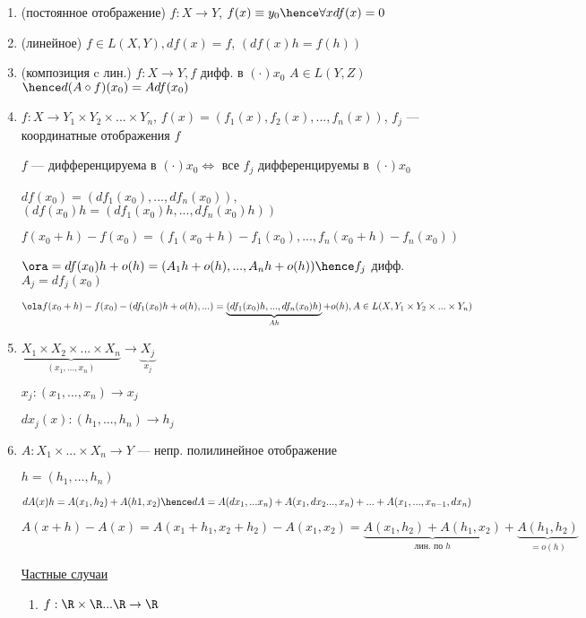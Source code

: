 \begin{examples}
\begin{enumerate}
    \item (постоянное отображение) $f: X \to Y$, $f(x) \equiv y_0 \hence \forall x df(x) = 0$
    \item (линейное) $f \in L(X, Y), df(x) = f$, $(df(x)h = f(h))$
    \item (композиция c лин.) $f : X \to Y, f$ дифф. в $(\cdot) x_0$ $A \in L(Y, Z)$ 
        $ \hence d(A \circ f)(x_0) = Adf(x_0)$
    \item $f : X \to Y_1 \times Y_2 \times ... \times Y_n$, $f(x) = (f_1(x), f_2(x), ..., f_n(x))$, $f_j$ --- координатные отображения $f$
    
    $f$ --- дифференцируема в $(\cdot) x_0 \Longleftrightarrow $ все $f_j $ дифференцируемы в $(\cdot) x_0$

    $df(x_0) = (df_1(x_0), ..., df_n(x_0))$, $\left( df(x_0)h = (df_1(x_0)h, ..., df_n(x_0)h) \right)$

    $f(x_0 + h) - f(x_0) = (f_1(x_0 + h) - f_1(x_0), ... , f_n(x_0 + h) - f_n(x_0))$

    $\ora = df(x_0)h + o(h) = (A_1h + o(h), ... , A_nh + o(h)) \hence f_j$ дифф. $A_j = df_j(x_0)$

    $\ola f(x_0 + h) - f(x_0) - (df_1(x_0)h + o(h), ... ) = \underbrace{(df_1(x_0) h, ... , df_n(x_0) h)}_{Ah} + o(h), A \in L(X, Y_1 \times Y_2 \times ... \times Y_n)$


    \item $\underbrace{X_1 \times X_2 \times ... \times X_n }_{(x_1, ... , x_n)}\to \underbrace{X_j}_{x_j}$
    
    $x_j : (x_1, ..., x_n) \to x_j$

    $dx_j(x) : (h_1, ..., h_n) \to h_j$
            
    \item $A : X_1 \times ... \times X_n \to Y$ --- непр. полилинейное отображение
    
    $h = (h_1, ..., h_n)$

    $dA(x)h = A(x_1, h_2) + A(h1, x_2) \hence dA = A(dx_1, ... x_n) + A(x_1, dx_2 ..., x_n) + ... + A(x_1, ..., x_{n- 1}, dx_n)$

    $A(x + h) - A(x) = A(x_1 + h_1, x_2 + h_2) - A(x_1, x_2) = \underbrace{A(x_1, h_2) + A(h_1, x_2)}_{\text{лин. по } h} + \underbrace{A(h_1, h_2)}_{=o(h)}$

    \underline{Частные случаи} 

    \begin{enumerate}
        \item $f : \R \times \R ... \R \to \R$
        

\end{enumerate}
\end{enumerate}
\end{examples}
